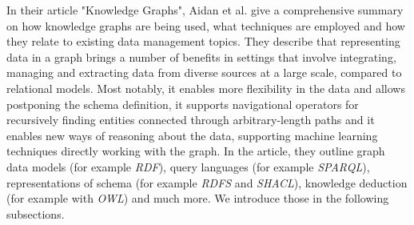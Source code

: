 In their article "Knowledge Graphs", Aidan et al. \cite{hogan2021knowledge} give a comprehensive summary on how knowledge graphs are being used, what techniques are employed and how they relate to existing data management topics.
They describe that representing data in a graph brings a number of benefits in settings that involve integrating, managing and extracting data from diverse sources at a large scale, compared to relational models.
Most notably, it enables more flexibility in the data and allows postponing the schema definition, it supports navigational operators for recursively finding entities connected through arbitrary-length paths and it enables new ways of reasoning about the data, supporting machine learning techniques directly working with the graph.
In the article, they outline graph data models (for example \textit{RDF}), query languages (for example \textit{SPARQL}), representations of schema (for example \textit{RDFS} and \textit{SHACL}), knowledge deduction (for example with \textit{OWL}) and much more.
We introduce those in the following subsections.



